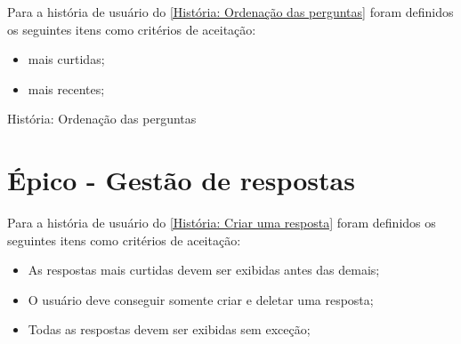 Para a história de usuário do \autoref{História: Ordenação das perguntas} foram definidos os seguintes itens como critérios de aceitação:

\begin{itemize}
\item mais curtidas;
\item mais recentes;
\end{itemize}

\def\arraystretch{2}
\begin{quadro}[htb]
\centering
\ABNTEXfontereduzida
\caption[História: Ordenação das perguntas]{História: Ordenação das perguntas}
\label{História: Ordenação das perguntas}
\end{quadro}
\FloatBarrier 

\section{Épico - Gestão de respostas}
\label{gestão_respostas}
Para a história de usuário do \autoref{História: Criar uma resposta} foram definidos os seguintes itens como critérios de aceitação:

\begin{itemize}
\item As respostas mais curtidas devem ser exibidas antes das demais;
\item O usuário deve conseguir somente criar e deletar uma resposta;
\item Todas as respostas devem ser exibidas sem exceção;
\end{itemize}

